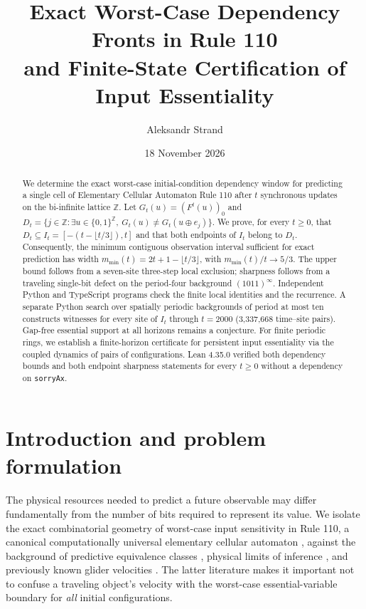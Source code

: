 \documentclass[11pt,a4paper]{article}
\title{\textbf{Exact Worst-Case Dependency Fronts in Rule 110\\and Finite-State Certification of Input Essentiality}}
\author{Aleksandr Strand}
\date{18 November 2026}
\theoremstyle{definition}
\theoremstyle{remark}
\newcommand{\Z}{\mathbb{Z}}
\newcommand{\xor}{\oplus}
\begin{document}
\maketitle
\begin{abstract}
We determine the exact worst-case initial-condition dependency window for predicting a single cell of Elementary Cellular Automaton Rule 110 after $t$ synchronous updates on the bi-infinite lattice $\Z$. Let $G_t(u)=(F^t(u))_0$ and $D_t=\{j\in\Z:\exists u\in\{0,1\}^{\Z},\ G_t(u)\ne G_t(u\xor e_j)\}$. We prove, for every $t\ge0$, that $D_t\subseteq I_t=[-(t-\lfloor t/3\rfloor),t]$ and that both endpoints of $I_t$ belong to $D_t$. Consequently, the minimum contiguous observation interval sufficient for exact prediction has width $m_{\min}(t)=2t+1-\lfloor t/3\rfloor$, with $m_{\min}(t)/t\to 5/3$. The upper bound follows from a seven-site three-step local exclusion; sharpness follows from a traveling single-bit defect on the period-four background $(1011)^\infty$. Independent Python and TypeScript programs check the finite local identities and the recurrence. A separate Python search over spatially periodic backgrounds of period at most ten constructs witnesses for every site of $I_t$ through $t=2000$ (3,337,668 time--site pairs). Gap-free essential support at all horizons remains a conjecture. For finite periodic rings, we establish a finite-horizon certificate for persistent input essentiality via the coupled dynamics of pairs of configurations. Lean 4.35.0 verified both dependency bounds and both endpoint sharpness statements for every $t\ge0$ without a dependency on \texttt{sorryAx}.
\end{abstract}

\section{Introduction and problem formulation}
The physical resources needed to predict a future observable may differ fundamentally from the number of bits required to represent its value. We isolate the exact combinatorial geometry of worst-case input sensitivity in Rule 110, a canonical computationally universal elementary cellular automaton \cite{cook2004}, against the background of predictive equivalence classes \cite{shalizi2001}, physical limits of inference \cite{wolpert2008}, and previously known glider velocities \cite{wolfram1986,martinez2006}. The latter literature makes it important not to confuse a traveling object's velocity with the worst-case essential-variable boundary for \emph{all} initial configurations.
\end{document}
